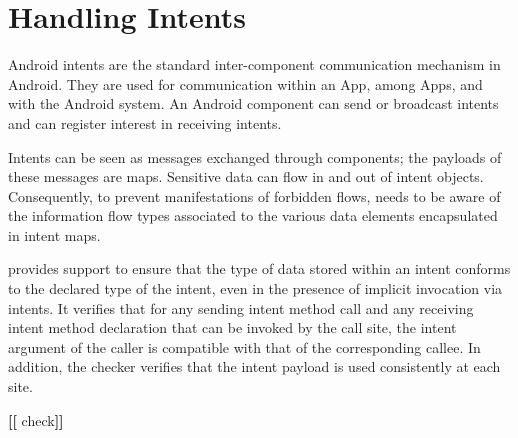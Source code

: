 \htmlhr

\newcommand{\app}{App\xspace}
\newcommand{\apps}{\app{}s\xspace}
\newcommand{\tp}[1]{\mathit{typeof}}
\newcommand{\Fix}[1]{\textbf{[[}{\color{red} #1}\textbf{]]}}


\chapter{Handling Intents\label{flow-checker}}

Android intents are the standard inter-component communication
mechanism in Android.  They are used for communication within an \app,
among \apps, and with the Android system.  An Android component can
send or broadcast intents and can register interest in receiving
intents.

Intents can be seen as messages exchanged through components; the
payloads of these messages are maps.  Sensitive data can flow in and
out of intent objects.  Consequently, to prevent manifestations of
forbidden flows, \theFlowChecker{} needs to be aware of the
information flow types associated to the various data elements
encapsulated in intent maps.

\TheFlowChecker{} provides support to
ensure that the type of data stored within an intent conforms to the
declared type of the intent, even in the presence of implicit
invocation via intents.  It verifies that for any sending intent
method call and any receiving intent method declaration that can be
invoked by the call site, the intent argument of the caller is
compatible with that of the corresponding callee.  In addition, the
checker verifies that the intent payload is used consistently at each
site.

\Fix{check}



